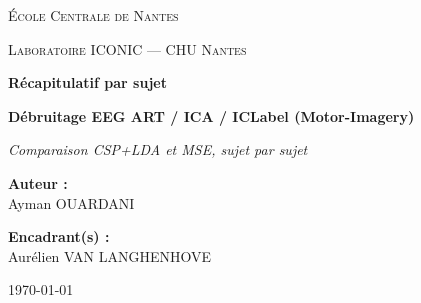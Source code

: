 \documentclass[11pt,a4paper]{article}
\begin{document}
\begin{titlepage}
\centering
\vspace*{1cm}

{\scshape\large École Centrale de Nantes\par}
\vspace{0.4cm}
{\scshape\large Laboratoire ICONIC — CHU Nantes\par}

\vfill
{\Huge\bfseries Récapitulatif par sujet\par}
\vspace{0.5cm}
{\Large\bfseries Débruitage EEG ART / ICA / ICLabel (Motor-Imagery)\par}
\vspace{0.8cm}
{\large\itshape Comparaison CSP+LDA et MSE, sujet par sujet\par}

\vfill
\begin{minipage}{0.45\linewidth}
  \raggedright
  \textbf{Auteur :}\\
  Ayman OUARDANI
\end{minipage}\hfill
\begin{minipage}{0.45\linewidth}
  \raggedleft
  \textbf{Encadrant(s) :}\\
  Aurélien VAN LANGHENHOVE
\end{minipage}

\vspace{1.2cm}
{\large \today\par}
\end{titlepage}

\clearpage
\end{document}
